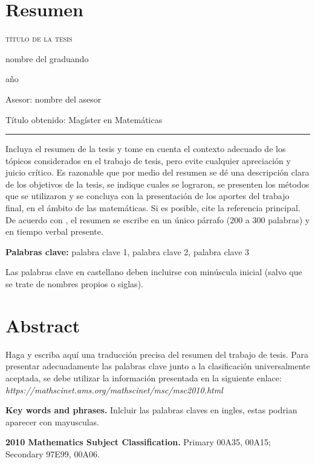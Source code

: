 \documentclass[12pt,a4paper,oneside,reqno]{book}%
\theoremstyle{definition}
\begin{document}
\chapter*{Resumen}
\thispagestyle{empty}
\begin{center}
\textsc{t\'itulo de la tesis}%
\end{center}
\begin{center}
nombre del graduando %
\end{center}
\begin{center}
 a\~{n}o %
\end{center}
\par
Asesor: nombre del asesor%
\par
T\'itulo obtenido: Mag\'ister en Matem\'aticas %
%
\smallskip %
%
\begin{center}%
\rule{14.50cm}{0.03cm}%
\smallskip%
\end{center}%
\noindent
Incluya el resumen de la tesis y tome en cuenta el contexto adecuado de los t\'opicos considerados en el trabajo de tesis, pero evite cualquier apreciaci\'on y juicio cr\'itico.
Es razonable que por medio del resumen se d\'e una descripci\'on clara de los objetivos de la tesis, se indique cuales se lograron, se presenten los m\'etodos que se utilizaron y se concluya con la presentaci\'on de los aportes del trabajo final, en el \'ambito de las matem\'aticas.
Si es posible, cite la referencia principal.
De acuerdo con  \cite{guiaFONDO}, el resumen se escribe en un \'unico p\'arrafo ($200$ a $300$ palabras)  y en tiempo verbal presente.
%
\vspace*{1cm}
\par
\textbf{Palabras clave:} palabra clave 1, palabra clave 2, palabra clave 3%
\par
Las palabras clave en castellano deben incluirse con min\'uscula inicial (salvo que se trate de nombres propios o siglas).
%
\chapter*{Abstract}
\thispagestyle{empty}
\noindent
Haga y escriba aqu\'i una traducci\'on precisa del resumen del trabajo de tesis.
Para presentar adecuadamente las palabras clave junto a la clasificaci\'on universalmente aceptada, se debe utilizar la informaci\'on presentada en la siguiente enlace:  \emph{https://mathscinet.ams.org/mathscinet/msc/msc2010.html}
%
\bigskip
\par
  \textbf{Key words and phrases.} Inlcluir las palabras claves en ingles, estas podrian aparecer con mayusculas.
\par
  \textbf{2010 Mathematics Subject Classification.} Primary 00A35, 00A15;  Secondary 97E99, 00A06.
\end{document}
